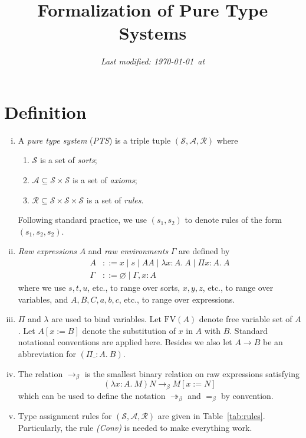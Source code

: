 \documentclass[oneside,a4paper]{article}
\title{\bf Formalization of Pure Type Systems}
\author{}
\date{\small \it Last modified: \today\ at \currenttime}
\theoremstyle{break}
\begin{document}
\maketitle

\section{Definition}
\begin{enumerate}[(i)]
\item A \emph{pure type system} (\emph{PTS}) is a triple tuple
  $(\mathcal{S},\mathcal{A},\mathcal{R})$ where

  \begin{enumerate}
  \item $\mathcal{S}$ is a set of \emph{sorts};
  \item $\mathcal{A}\subseteq \mathcal{S} \times \mathcal{S}$ is a set
    of \emph{axioms};
  \item
    $\mathcal{R}\subseteq \mathcal{S} \times \mathcal{S} \times
    \mathcal{S}$ is a set of \emph{rules}.
  \end{enumerate}

Following standard practice, we use $(s_{1}, s_{2})$ to denote rules
of the form $(s_{1}, s_{2}, s_{2})$.

\item \emph{Raw expressions} $A$ and \emph{raw environments} $\Gamma$
  are defined by
  \begin{align*}
    A &::= x \mid s \mid AA \mid \lambda x:A.\ A \mid \Pi x:A.\ A\\
    \Gamma &::= \varnothing \mid \Gamma,x:A
  \end{align*}
  where we use $s,t,u$, etc., to range over sorts, $x,y,z$, etc., to
  range over variables, and $A,B,C,a,b,c$, etc., to range over
  expressions.

\item $\Pi$ and $\lambda$ are used to bind variables. Let
  $\mathrm{FV}(A)$ denote free variable set of $A$. Let $A[x:=B]$
  denote the substitution of $x$ in $A$ with $B$. Standard notational
  conventions are applied here. Besides we also let $A \to B$ be an
  abbreviation for $(\Pi \_:A.\ B)$.

\item The relation $\to _ \beta$ is the smallest binary relation on
  raw expressions satisfying
  \[ (\lambda x:A.\ M)N \to _ \beta M[x:=N] \]
  which can be used to define the notation $\twoheadrightarrow_\beta$
  and $=_\beta$ by convention.

\item Type assignment rules for
  $(\mathcal{S},\mathcal{A},\mathcal{R})$ are given in
  Table~\ref{tab:rules}. Particularly, the rule \emph{(Conv)} is
  needed to make everything work.

\end{enumerate}
\end{document}
